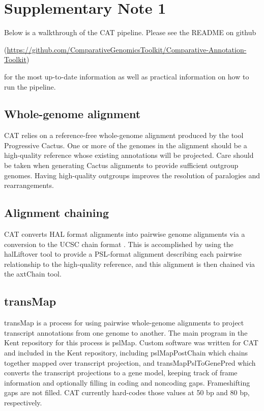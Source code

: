 \documentclass[fleqn,10pt]{wlscirep}
\newcommand{\beginsupplement}{%
    \setcounter{table}{0}
    \renewcommand{\thetable}{S\arabic{table}}%
    \setcounter{figure}{0}
    \renewcommand{\thefigure}{S\arabic{figure}}%
   }
\begin{document}


\clearpage
\beginsupplement

\section*{Supplementary Note 1}

Below is a walkthrough of the CAT pipeline. Please see the README on github 

(\url{https://github.com/ComparativeGenomicsToolkit/Comparative-Annotation-Toolkit}) 

for the most up-to-date information as well as practical information on how to run the pipeline. 

\subsection*{Whole-genome alignment}
	CAT relies on a reference-free whole-genome alignment produced by the tool Progressive Cactus. One or more of the genomes in the alignment should be a high-quality reference whose existing annotations will be projected. Care should be taken when generating Cactus alignments to provide sufficient outgroup genomes. Having high-quality outgroups improves the resolution of paralogies and rearrangements.

\subsection*{Alignment chaining}
	CAT converts HAL format alignments into pairwise genome alignments via a conversion to the UCSC chain format \cite{kent2003evolution}. This is accomplished by using the halLiftover tool to provide a PSL-format alignment describing each pairwise relationship to the high-quality reference, and this alignment is then chained via the axtChain tool. 
  
\subsection*{transMap}
	transMap \cite{stanke2008using,zhu2007comparative} is a process for using pairwise whole-genome alignments to project transcript annotations from one genome to another. The main program in the Kent repository for this process is pslMap. Custom software was written for CAT and included in the Kent repository, including pslMapPostChain which chains together mapped over transcript projection, and transMapPslToGenePred which converts the transcript projections to a gene model, keeping track of frame information and optionally filling in coding and noncoding gaps. Frameshifting gaps are not filled. CAT currently hard-codes those values at 50 bp and 80 bp, respectively.
  
\end{document}
